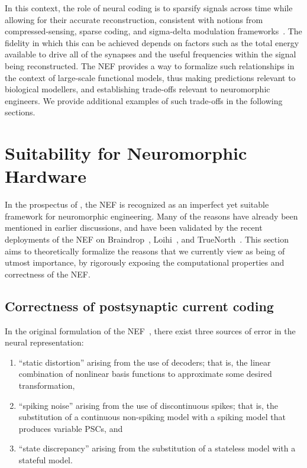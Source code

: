 In this context, the role of neural coding is to sparsify signals across time while allowing for their accurate reconstruction, consistent with notions from compressed-sensing, sparse coding, and sigma-delta modulation frameworks~\citep{coulter2010adaptive, chklovskii2012neuronal, yoon2017lif}.
The fidelity in which this can be achieved depends on factors such as the total energy available to drive all of the synapses and the useful frequencies within the signal being reconstructed.
The NEF provides a way to formalize such relationships in the context of large-scale functional models, thus making predictions relevant to biological modellers, and establishing trade-offs relevant to neuromorphic engineers.
We provide additional examples of such trade-offs in the following sections.

\section{Suitability for Neuromorphic Hardware}
\label{sec:nef-suitability}

In the prospectus of \citet{boahen2017neuromorph}, the NEF is recognized as an imperfect yet suitable framework for neuromorphic engineering.
Many of the reasons have already been mentioned in earlier discussions, and have been 
validated by the recent deployments of the NEF on Braindrop~\citep{braindrop2019}, Loihi~\citep{blouw2018a}, and TrueNorth~\citep{fischl2018}.
This section aims to theoretically formalize the reasons that we currently view as being of utmost importance, by rigorously exposing the computational properties and correctness of the NEF.

\subsection{Correctness of postsynaptic current coding}
\label{sec:spike-coding}

In the original formulation of the NEF~\citep{eliasmith2003a}, there exist three sources of error in the neural representation:
\begin{enumerate}
\item ``static distortion'' arising from the use of decoders; that is, the linear combination of nonlinear basis functions to approximate some desired transformation,
\item ``spiking noise'' arising from the use of discontinuous spikes; that is, the substitution of a continuous non-spiking model with a spiking model that produces variable PSCs, and
\item ``state discrepancy'' arising from the substitution of a stateless model with a stateful model.
\end{enumerate}

